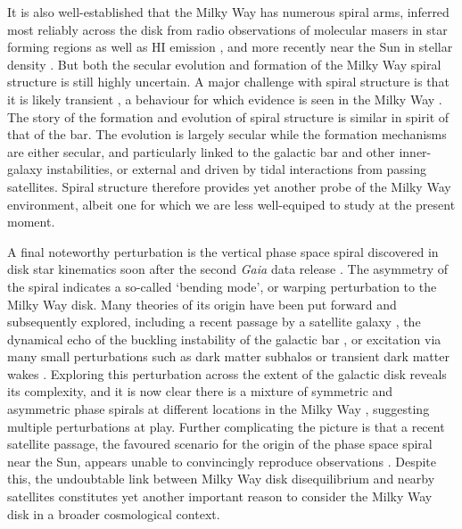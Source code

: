 It is also well-established that the Milky Way has numerous spiral arms, inferred most reliably across the disk from radio observations of molecular masers in star forming regions as well as HI emission \parencite{levine06,reid14,reid19}, and more recently near the Sun in stellar density \parencite{eilers19}. But both the secular evolution and formation of the Milky Way spiral structure is still highly uncertain. A major challenge with spiral structure is that it is likely transient \parencite[see][]{sellwood14}, a behaviour for which evidence is seen in the Milky Way \parencite{hunt18,sellwood19}. The story of the formation and evolution of spiral structure is similar in spirit of that of the bar. The evolution is largely secular while the formation mechanisms are either secular, and particularly linked to the galactic bar and other inner-galaxy instabilities, or external and driven by tidal interactions from passing satellites. Spiral structure therefore provides yet another probe of the Milky Way environment, albeit one for which we are less well-equiped to study at the present moment.

A final noteworthy perturbation is the vertical phase space spiral discovered in disk star kinematics soon after the second \textit{Gaia} data release \parencite{antoja18}. The asymmetry of the spiral indicates a so-called `bending mode', or warping perturbation to the Milky Way disk. Many theories of its origin have been put forward and subsequently explored, including a recent passage by a satellite galaxy \parencite{laporte19}, the dynamical echo of the buckling instability of the galactic bar \parencite{khoperskov19}, or excitation via many small perturbations such as dark matter subhalos or transient dark matter wakes \parencite{tremaine23,grand23}. Exploring this perturbation across the extent of the galactic disk reveals its complexity, and it is now clear there is a mixture of symmetric and asymmetric phase spirals at different locations in the Milky Way \parencite{hunt22}, suggesting multiple perturbations at play. Further complicating the picture is that a recent satellite passage, the favoured scenario for the origin of the phase space spiral near the Sun, appears unable to convincingly reproduce observations \parencite{bennett21,bennett22}. Despite this, the undoubtable link between Milky Way disk disequilibrium and nearby satellites constitutes yet another important reason to consider the Milky Way disk in a broader cosmological context.

